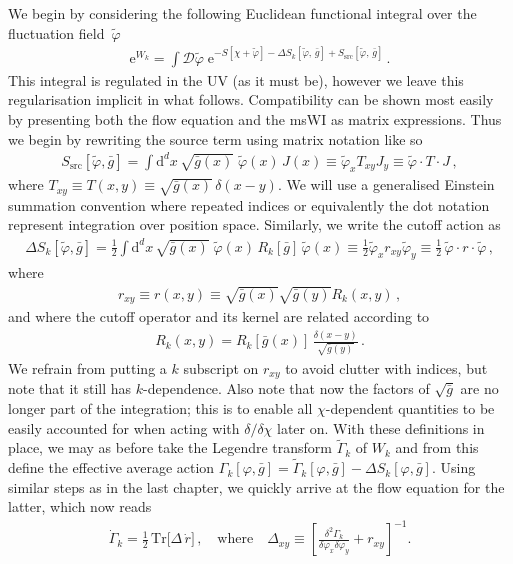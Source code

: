 \documentclass[11pt]{book}
\numberwithin{equation}{chapter}
\begin{document}
We begin by considering the following Euclidean functional integral over the fluctuation field~$\tilde\varphi$
\begin{align}
  \mathrm e^{W_k} = \int \mathcal{D}\tilde\varphi \;
  \mathrm e^{
    - S[\chi+\tilde\varphi]
    - \Delta S_k[\tilde\varphi,\, \bar g]
    + S_{\mathrm{src}}[\tilde\varphi, \, \bar g]
  } \,.
  \label{Z}
\end{align}
This integral is regulated in the UV (as it must be), however we leave this regularisation implicit
in what follows. Compatibility can be shown most easily by presenting both the flow equation and the
msWI as matrix expressions. Thus we begin by rewriting the source term using matrix notation like so
\begin{align}
	S_\mathrm{src}[\tilde\varphi,\bar g] = \int \mathrm d^d x \, \sqrt{\bar g(x)} \;
  \tilde\varphi(x) \, J(x)
  \equiv \tilde\varphi_xT_{xy}J_y
  \equiv \tilde\varphi\cdot T\cdot J \,,
\end{align}
where $T_{xy}\equiv T(x,y)\equiv\sqrt{\bar g(x)} \, \delta(x-y)$. We will use a generalised
Einstein summation convention where repeated indices or equivalently the dot notation represent
integration over position space. Similarly, we write the cutoff action as
\begin{align}
  \Delta S_k[\tilde\varphi, \bar g] = \frac{1}{2} \int \mathrm d^d x \, \sqrt{\bar g(x)} \;
  \tilde\varphi(x) \, R_k[\bar g] \, \tilde\varphi(x)
  \equiv \frac{1}{2}\tilde\varphi_x r_{xy} \tilde\varphi_{y}
  \equiv\frac{1}{2}\,\tilde\varphi\cdot r \cdot\tilde\varphi \,,
  \label{cutoff-action}
\end{align}
where
\begin{align}
  r_{xy}\equiv r(x,y)\equiv\sqrt{\bar g(x)}\sqrt{\bar g(y)}R_{k}(x,y)\,,
  \label{odd-r}
\end{align}
and where the cutoff operator and its kernel are related according to
\begin{align}
  R_k(x,y) = R_{k}[\bar g(x)] \, \frac{\delta(x-y)}{\sqrt{\bar g(y)}} \,.
\end{align}
We refrain from putting a $k$ subscript on $r_{xy}$ to avoid clutter with indices,
but note that it still has $k$-dependence. Also note that now the factors of $\sqrt{\bar g}$ are no
longer part of the integration; this is to enable all $\chi$-dependent quantities to be easily accounted
for when acting with $\delta/\delta\chi$ later on.
With these definitions in place, we may as before take the Legendre transform $\tilde\Gamma_{k}$ of $W_k$
and from this define the effective average action
$\Gamma_k[\varphi,\bar g] = \tilde\Gamma_k[\varphi,\bar g] - \Delta S_k[\varphi,\bar g]$.
Using similar steps as in the last chapter, we quickly arrive at the flow equation
for the latter, which now reads
\begin{align}
  \dot \Gamma_k =
  \frac{1}{2} \, \mathrm{Tr} \big[ \Delta \, \dot r \big] \,,
  \quad \text{where} \quad
  \Delta_{xy}\equiv\left[\frac{\delta^{2}\Gamma_k}{\delta\varphi_x \delta\varphi_y}+r_{xy}\right]^{-1} .
  \label{flow1}
\end{align}
\end{document}
